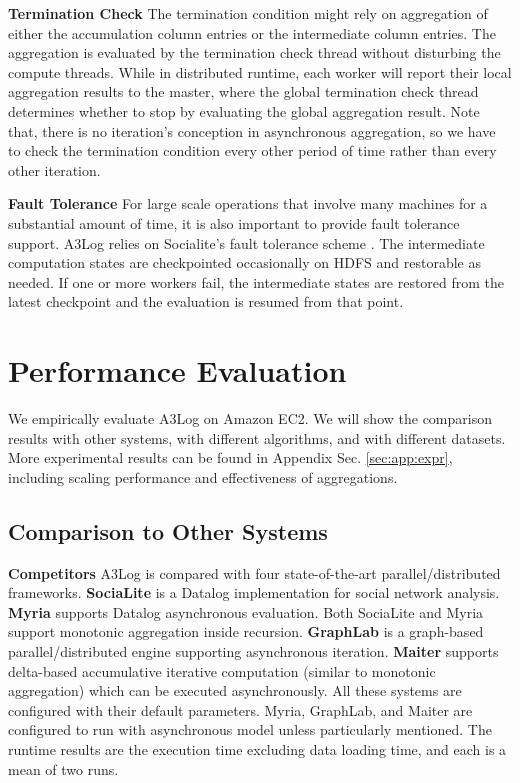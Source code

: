 \documentclass{vldb}
\begin{document}
\noindent\textbf{Termination Check}
The termination condition might rely on aggregation of either the accumulation column entries or the intermediate column entries. The aggregation is evaluated by the termination check thread without disturbing the compute threads. While in distributed runtime, each worker will report their local aggregation results to the master, where the global termination check thread determines whether to stop by evaluating the global aggregation result. Note that, there is no iteration's conception in asynchronous aggregation, so we have to check the termination condition every other period of time rather than every other iteration.

\noindent\textbf{Fault Tolerance}
For large scale operations that involve many machines for a substantial amount of time, it is also important to provide fault tolerance support. A3Log relies on Socialite's fault tolerance scheme \cite{Seo:2013:DSD:2556549.2556572}. The intermediate computation states are checkpointed occasionally on HDFS and restorable as needed. If one or more workers fail, the intermediate states are restored from the latest checkpoint and the evaluation is resumed from that point.

\section{Performance Evaluation}
\label{sec:expr}

We empirically evaluate A3Log on Amazon EC2. We will show the comparison results with other systems, with different algorithms, and with different datasets. More experimental results can be found in Appendix Sec. \ref{sec:app:expr}, including scaling performance and effectiveness of aggregations.



\subsection{Comparison to Other Systems}
\label{sec:expr:othersystems}

\noindent\textbf{Competitors}
A3Log is compared with four state-of-the-art parallel/distributed frameworks. \textbf{SociaLite} \cite{Lam:2013:SDE:2510649.2511289,Seo:2013:DSD:2556549.2556572} is a Datalog implementation for social network analysis. \textbf{Myria} \cite{Halperin:2014:DMB:2588555.2594530,Wang:2015:AFR:2824032.2824052} supports Datalog asynchronous evaluation. Both SociaLite and Myria support monotonic aggregation inside recursion. \textbf{GraphLab} \cite{Low:2012:DGF:2212351.2212354} is a graph-based parallel/distributed engine supporting asynchronous iteration. \textbf{Maiter} \cite{maiter} supports delta-based accumulative iterative computation (similar to monotonic aggregation) which can be executed asynchronously. All these systems are configured with their default parameters. Myria, GraphLab, and Maiter are configured to run with asynchronous model unless particularly mentioned. The runtime results are the execution time excluding data loading time, and each is a mean of two runs.
\end{document}
